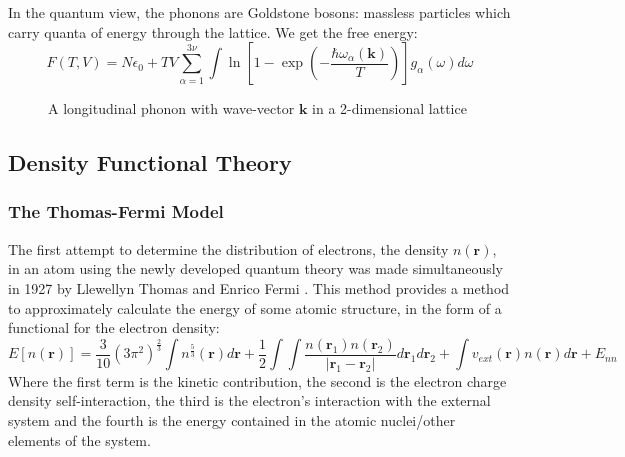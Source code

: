 \documentclass[12pt]{article}
\begin{document}
In the quantum view, the phonons are Goldstone bosons: massless particles which carry quanta of energy through the lattice. We get the free energy:
\begin{equation}
	F(T, V) = N\epsilon_0 + TV\sum_{\alpha=1}^{3\nu}\int \ln \left[ 1-\exp\left(-\frac{\hbar \omega_\alpha(\mathbf k)}{T}\right)\right]g_\alpha(\omega)d\omega
\end{equation}

\begin{figure}
\centering
{}
\caption{A longitudinal phonon with wave-vector $\mathbf k$ in a 2-dimensional lattice}
\label{fig:phonon:disturbance}
\end{figure}

\subsection{Density Functional Theory}
\subsubsection{The Thomas-Fermi Model}
The first attempt to determine the distribution of electrons, the density $n(\mathbf r)$, in an atom using the newly developed quantum theory was made simultaneously in 1927 by Llewellyn Thomas \cite{thomas_1927} and Enrico Fermi \cite{fermi1927metodo}. This method provides a method to approximately calculate the energy of some atomic structure, in the form of a functional for the electron density:
\begin{equation}\label{eq:thomas-fermi}
	E[n(\mathbf r)] = \frac{3}{10}(3\pi^2)^{\frac{2}{3}}\int n^{\frac{5}{3}}(\mathbf r) d \mathbf r + \frac{1}{2}\int\int\frac{n(\mathbf r_1) n(\mathbf r_2)}{\left| \mathbf r_1 - \mathbf r_2\right|}d\mathbf r_1 d\mathbf r_2 + \int v_{ext}(\mathbf r) n(\mathbf r) d \mathbf r + E_{nn}
\end{equation}
Where the first term is the kinetic contribution, the second is the electron charge density self-interaction, the third is the electron's interaction with the external system and the fourth is the energy contained in the atomic nuclei/other elements of the system.
\end{document}
